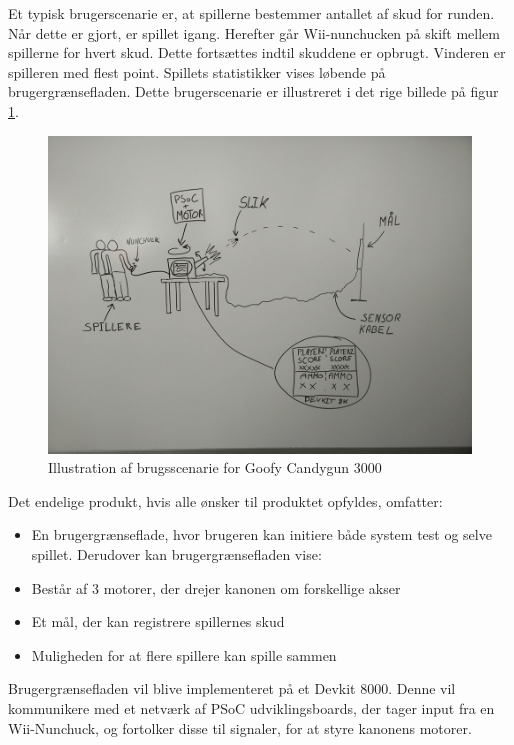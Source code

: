 \noindent Et typisk brugerscenarie er, at spillerne bestemmer antallet af skud for runden. Når dette er gjort, er spillet igang. Herefter går Wii-nunchucken på skift mellem spillerne for hvert skud. Dette fortsættes indtil skuddene er opbrugt. Vinderen er spilleren med flest point. Spillets statistikker vises løbende på brugergrænsefladen. Dette brugerscenarie er illustreret i det rige billede på figur \ref{fig:RigtBillede}.

\begin{figure}[H]
	\centering
	\includegraphics[width=\textwidth]{Projektformulering/images/rigtBillede}
	\caption{Illustration af brugsscenarie for Goofy Candygun 3000}
	\label{fig:RigtBillede}
\end{figure}

Det endelige produkt, hvis alle ønsker til produktet opfyldes, omfatter:
\begin{itemize}
	\item{En brugergrænseflade, hvor brugeren kan initiere både system test og selve spillet. Derudover kan brugergrænsefladen vise:}
	\item{Består af 3 motorer, der drejer kanonen om forskellige akser}
	\item{Et mål, der kan registrere spillernes skud}
	\item {Muligheden for at flere spillere kan spille sammen}
\end{itemize}

\noindent Brugergrænsefladen vil blive implementeret på et Devkit 8000. Denne vil kommunikere med et netværk af PSoC udviklingsboards, der tager input fra en Wii-Nunchuck, og fortolker disse til signaler, for at styre kanonens motorer.
